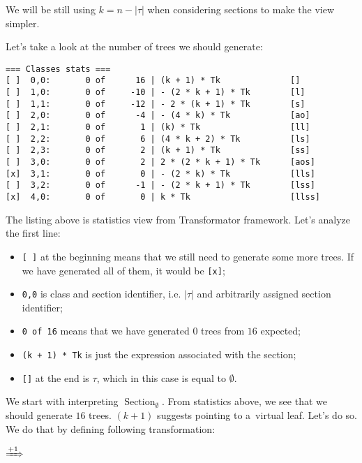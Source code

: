 \documentclass[final]{article}
\theoremstyle{definition}
\theoremstyle{definition}
\theoremstyle{remark}
\DeclareMathOperator{\tSection}{\text{Section}}
\newcommand{\includeinlinescaledsvg}[3]{\begin{minipage}{#1\textwidth}\begin{center}\end{center}\end{minipage}}
\begin{document}
We will be still using \(k = n - |\tau|\) when considering sections to make the view simpler.

Let's take a look at the number of trees we should generate:

\begin{lstlisting}
=== Classes stats ===
[ ]  0,0:       0 of      16 | (k + 1) * Tk              []
[ ]  1,0:       0 of     -10 | - (2 * k + 1) * Tk        [l]
[ ]  1,1:       0 of     -12 | - 2 * (k + 1) * Tk        [s]
[ ]  2,0:       0 of      -4 | - (4 * k) * Tk            [ao]
[ ]  2,1:       0 of       1 | (k) * Tk                  [ll]
[ ]  2,2:       0 of       6 | (4 * k + 2) * Tk          [ls]
[ ]  2,3:       0 of       2 | (k + 1) * Tk              [ss]
[ ]  3,0:       0 of       2 | 2 * (2 * k + 1) * Tk      [aos]
[x]  3,1:       0 of       0 | - (2 * k) * Tk            [lls]
[ ]  3,2:       0 of      -1 | - (2 * k + 1) * Tk        [lss]
[x]  4,0:       0 of       0 | k * Tk                    [llss]
\end{lstlisting}

The listing above is statistics view from Transformator framework. Let's analyze the first line:
\begin{itemize}
    \item \verb|[ ]| at the beginning means that we still need to generate some more trees. If we have generated all of them, it would be \verb|[x]|;
    \item \verb|0,0| is class and section identifier, i.e. \(|\tau|\) and arbitrarily assigned section identifier;
    \item \verb|0 of 16| means that we have generated \(0\) trees from \(16\) expected;
    \item \verb|(k + 1) * Tk| is just the expression associated with the section;
    \item \verb|[]| at the end is \(\tau\), which in this case is equal to \(\emptyset\).
\end{itemize}

We start with interpreting \(\tSection_\emptyset\). From statistics above, we see that we should generate \(16\) trees. \((k + 1)\) suggests pointing to a~virtual leaf. Let's do so. We do that by defining following transformation:

\begin{center}
    \includeinlinescaledsvg{.4}{.7}{lambda__transformations__001a}%
    \(\xRightarrow{+1}\)%
    \includeinlinescaledsvg{.4}{.7}{lambda__transformations__001b}%
\end{center}
\end{document}
